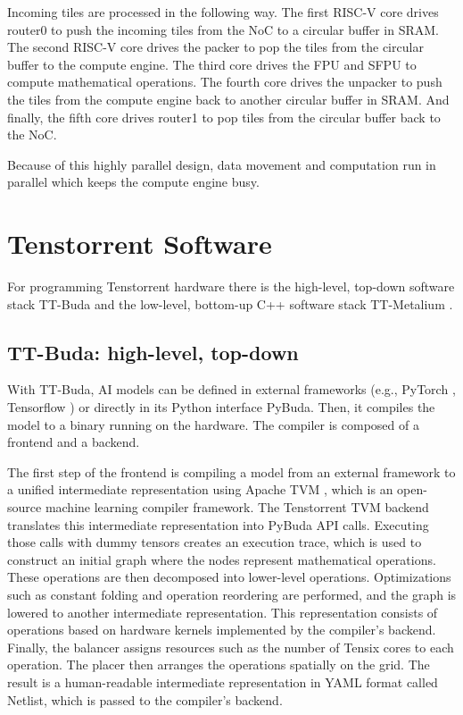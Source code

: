 \documentclass[conference]{IEEEtran}
\begin{document}
Incoming tiles are processed in the following way. The first RISC-V core drives router0 to push the incoming tiles from the NoC to a circular buffer in SRAM. The second RISC-V core drives the packer to pop the tiles from the circular buffer to the compute engine. The third core drives the FPU and SFPU to compute mathematical operations. The fourth core drives the unpacker to push the tiles from the compute engine back to another circular buffer in SRAM. And finally, the fifth core drives router1 to pop tiles from the circular buffer back to the NoC.

Because of this highly parallel design, data movement and computation run in parallel which keeps the compute engine busy.

\section{Tenstorrent Software}
For programming Tenstorrent hardware there is the high-level, top-down software stack TT-Buda \cite{tt-buda} and the low-level, bottom-up C++ software stack TT-Metalium \cite{tt-metalium}. 
\subsection{TT-Buda: high-level, top-down}
With TT-Buda, AI models can be defined in external frameworks (e.g., PyTorch \cite{paszke2019}, Tensorflow \cite{abadi2015}) or directly in its Python interface PyBuda. Then, it compiles the model to a binary running on the hardware. The compiler is composed of a frontend and a backend. 

The first step of the frontend is compiling a model from an external framework to a unified intermediate representation using Apache TVM \cite{chen2018}, which is an open-source machine learning compiler framework. The Tenstorrent TVM backend translates this intermediate representation into PyBuda API calls. Executing those calls with dummy tensors creates an execution trace, which is used to construct an initial graph where the nodes represent mathematical operations. These operations are then decomposed into lower-level operations. Optimizations such as constant folding and operation reordering are performed, and the graph is lowered to another intermediate representation. This representation consists of operations based on hardware kernels implemented by the compiler's backend. 
Finally, the balancer assigns resources such as the number of Tensix cores to each operation. The placer then arranges the operations spatially on the grid. The result is a human-readable intermediate representation in YAML format called Netlist, which is passed to the compiler's backend.
\end{document}
